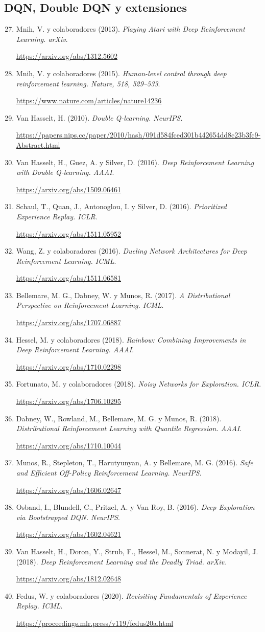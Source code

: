 \documentclass[11pt,a4paper]{article}
\newcommand{\fuente}[4]{\item\label{#1} #2. \textit{#3}.\par{\small\raggedright\url{#4}\par}}
\begin{document}
\subsection*{DQN, Double DQN y extensiones}
\begin{enumerate}
\setcounter{enumi}{26}
\renewcommand{\labelenumi}{[\arabic{enumi}]}
\setlength{\itemsep}{0.7em}
\fuente{f:dqn13}{Mnih, V. y colaboradores (2013)}{Playing Atari with Deep Reinforcement Learning. arXiv}{https://arxiv.org/abs/1312.5602}
\fuente{f:dqn15}{Mnih, V. y colaboradores (2015)}{Human-level control through deep reinforcement learning. Nature, 518, 529--533}{https://www.nature.com/articles/nature14236}
\fuente{f:doubleq}{Van Hasselt, H. (2010)}{Double Q-learning. NeurIPS}{https://papers.nips.cc/paper/2010/hash/091d584fced301b442654dd8c23b3fc9-Abstract.html}
\fuente{f:ddqn}{Van Hasselt, H., Guez, A. y Silver, D. (2016)}{Deep Reinforcement Learning with Double Q-learning. AAAI}{https://arxiv.org/abs/1509.06461}
\fuente{f:per}{Schaul, T., Quan, J., Antonoglou, I. y Silver, D. (2016)}{Prioritized Experience Replay. ICLR}{https://arxiv.org/abs/1511.05952}
\fuente{f:dueling}{Wang, Z. y colaboradores (2016)}{Dueling Network Architectures for Deep Reinforcement Learning. ICML}{https://arxiv.org/abs/1511.06581}
\fuente{f:c51}{Bellemare, M. G., Dabney, W. y Munos, R. (2017)}{A Distributional Perspective on Reinforcement Learning. ICML}{https://arxiv.org/abs/1707.06887}
\fuente{f:rainbow}{Hessel, M. y colaboradores (2018)}{Rainbow: Combining Improvements in Deep Reinforcement Learning. AAAI}{https://arxiv.org/abs/1710.02298}
\fuente{f:noisy}{Fortunato, M. y colaboradores (2018)}{Noisy Networks for Exploration. ICLR}{https://arxiv.org/abs/1706.10295}
\fuente{f:qr}{Dabney, W., Rowland, M., Bellemare, M. G. y Munos, R. (2018)}{Distributional Reinforcement Learning with Quantile Regression. AAAI}{https://arxiv.org/abs/1710.10044}
\fuente{f:retrace}{Munos, R., Stepleton, T., Harutyunyan, A. y Bellemare, M. G. (2016)}{Safe and Efficient Off-Policy Reinforcement Learning. NeurIPS}{https://arxiv.org/abs/1606.02647}
\fuente{f:bootdqn}{Osband, I., Blundell, C., Pritzel, A. y Van Roy, B. (2016)}{Deep Exploration via Bootstrapped DQN. NeurIPS}{https://arxiv.org/abs/1602.04621}
\fuente{f:triad}{Van Hasselt, H., Doron, Y., Strub, F., Hessel, M., Sonnerat, N. y Modayil, J. (2018)}{Deep Reinforcement Learning and the Deadly Triad. arXiv}{https://arxiv.org/abs/1812.02648}
\fuente{f:replay}{Fedus, W. y colaboradores (2020)}{Revisiting Fundamentals of Experience Replay. ICML}{https://proceedings.mlr.press/v119/fedus20a.html}
\end{enumerate}
\end{document}

